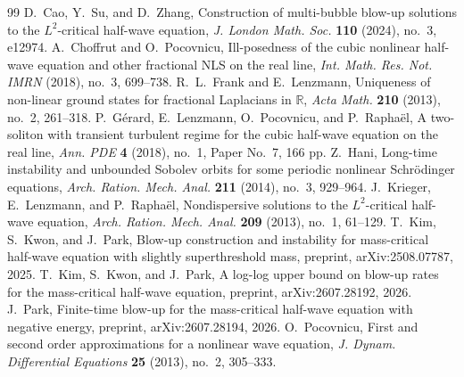 \documentclass[10pt,a4paper]{amsart}
\numberwithin{equation}{section}
\begin{document}
\begin{thebibliography}{99}
 D.~Cao, Y.~Su, and D.~Zhang, \newblock Construction of multi-bubble blow-up solutions to the $L^2$-critical half-wave equation, \newblock \emph{J. London Math. Soc.} \textbf{110} (2024), no.~3, e12974.
 A.~Choffrut and O.~Pocovnicu, \newblock Ill-posedness of the cubic nonlinear half-wave equation and other fractional NLS on the real line, \newblock \emph{Int. Math. Res. Not. IMRN} (2018), no.~3, 699--738.
 R.~L.~Frank and E.~Lenzmann, \newblock Uniqueness of non-linear ground states for fractional Laplacians in $\mathbb R$, \newblock \emph{Acta Math.} \textbf{210} (2013), no.~2, 261--318.
 P.~G\'erard, E.~Lenzmann, O.~Pocovnicu, and P.~Rapha\"el, \newblock A two-soliton with transient turbulent regime for the cubic half-wave equation on the real line, \newblock \emph{Ann. PDE} \textbf{4} (2018), no.~1, Paper No.~7, 166 pp.
 Z.~Hani, \newblock Long-time instability and unbounded Sobolev orbits for some periodic nonlinear Schr\"odinger equations, \newblock \emph{Arch. Ration. Mech. Anal.} \textbf{211} (2014), no.~3, 929--964.
 J.~Krieger, E.~Lenzmann, and P.~Rapha\"el, \newblock Nondispersive solutions to the $L^2$-critical half-wave equation, \newblock \emph{Arch. Ration. Mech. Anal.} \textbf{209} (2013), no.~1, 61--129.
 T.~Kim, S.~Kwon, and J.~Park, \newblock Blow-up construction and instability for mass-critical half-wave equation with slightly superthreshold mass, \newblock preprint, arXiv:2508.07787, 2025.
 T.~Kim, S.~Kwon, and J.~Park, \newblock A log-log upper bound on blow-up rates for the mass-critical half-wave equation, \newblock preprint, arXiv:2607.28192, 2026.
 J.~Park, \newblock Finite-time blow-up for the mass-critical half-wave equation with negative energy, \newblock preprint, arXiv:2607.28194, 2026.
 O.~Pocovnicu, \newblock First and second order approximations for a nonlinear wave equation, \newblock \emph{J. Dynam. Differential Equations} \textbf{25} (2013), no.~2, 305--333.
\end{thebibliography}
\end{document}
